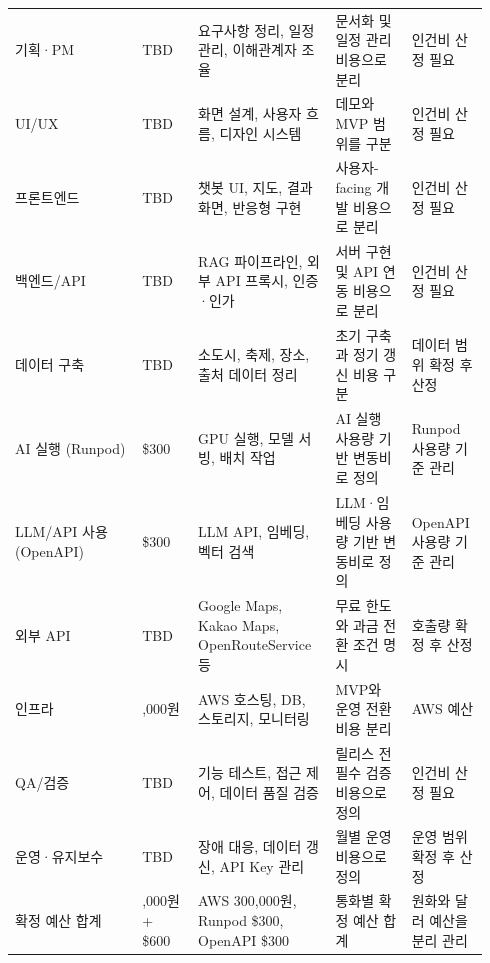 \documentclass[12pt,a4paper]{article}
\newcommand{\DocNeedspace}[1]{\par\ifdim\dimexpr\pagegoal-\pagetotal\relax<#1\newpage\fi}
\renewcommand{\arraystretch}{1.35}
\begin{document}
\DocNeedspace{30\baselineskip}
\begin{footnotesize}
\setlength{\tabcolsep}{3pt}
\setlength{\extrarowheight}{1pt}
\renewcommand{\arraystretch}{1.48}
\begin{longtable}{@{}>{\centering\arraybackslash}m{0.250\linewidth}>{\centering\arraybackslash}m{0.115\linewidth}>{\RaggedRight\arraybackslash}m{0.270\linewidth}>{\RaggedRight\arraybackslash}m{0.154\linewidth}>{\RaggedRight\arraybackslash}m{0.146\linewidth}@{}}
\toprule
\multicolumn{1}{>{\centering\arraybackslash}m{0.250\linewidth}}{\textbf{예산 구분}} & \multicolumn{1}{>{\centering\arraybackslash}m{0.115\linewidth}}{\textbf{예산}} & \multicolumn{1}{>{\centering\arraybackslash}m{0.270\linewidth}}{\textbf{포함 항목}} & \multicolumn{1}{>{\centering\arraybackslash}m{0.154\linewidth}}{\textbf{반영 방향}} & \multicolumn{1}{>{\centering\arraybackslash}m{0.146\linewidth}}{\textbf{비고}} \\
\midrule
\endhead
기획·PM & TBD & 요구사항 정리, 일정 관리, 이해관계자 조율 & 문서화 및 일정 관리 비용으로 분리 & 인건비 산정 필요 \\
UI/UX & TBD & 화면 설계, 사용자 흐름, 디자인 시스템 & 데모와 MVP 범위를 구분 & 인건비 산정 필요 \\
프론트엔드 & TBD & 챗봇 UI, 지도, 결과 화면, 반응형 구현 & 사용자-facing 개발 비용으로 분리 & 인건비 산정 필요 \\
백엔드/API & TBD & RAG 파이프라인, 외부 API 프록시, 인증·인가 & 서버 구현 및 API 연동 비용으로 분리 & 인건비 산정 필요 \\
데이터 구축 & TBD & 소도시, 축제, 장소, 출처 데이터 정리 & 초기 구축과 정기 갱신 비용 구분 & 데이터 범위 확정 후 산정 \\
AI 실행 (Runpod) & \$300 & GPU 실행, 모델 서빙, 배치 작업 & AI 실행 사용량 기반 변동비로 정의 & Runpod 사용량 기준 관리 \\
LLM/API 사용 (OpenAPI) & \$300 & LLM API, 임베딩, 벡터 검색 & LLM·임베딩 사용량 기반 변동비로 정의 & OpenAPI 사용량 기준 관리 \\
외부 API & TBD & Google Maps, Kakao Maps, OpenRouteService 등 & 무료 한도와 과금 전환 조건 명시 & 호출량 확정 후 산정 \\
인프라 & 300,000원 & AWS 호스팅, DB, 스토리지, 모니터링 & MVP와 운영 전환 비용 분리 & AWS 예산 \\
QA/검증 & TBD & 기능 테스트, 접근 제어, 데이터 품질 검증 & 릴리스 전 필수 검증 비용으로 정의 & 인건비 산정 필요 \\
운영·유지보수 & TBD & 장애 대응, 데이터 갱신, API Key 관리 & 월별 운영 비용으로 정의 & 운영 범위 확정 후 산정 \\
확정 예산 합계 & 300,000원 + \$600 & AWS 300,000원, Runpod \$300, OpenAPI \$300 & 통화별 확정 예산 합계 & 원화와 달러 예산을 분리 관리 \\
\bottomrule
\end{longtable}
\end{footnotesize}
\end{document}
